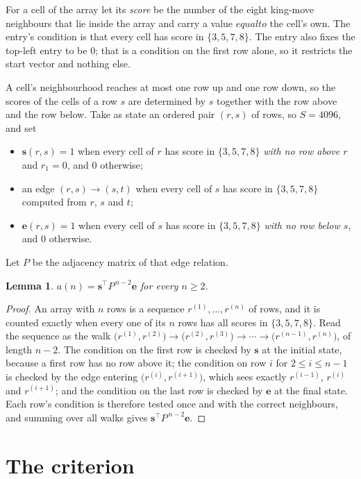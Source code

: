 \documentclass[11pt,a4paper]{article}
\theoremstyle{plain}
\newtheorem{lemma}[theorem]{Lemma}
\theoremstyle{definition}
\begin{document}
For a cell of the array let its \emph{score} be the number of the eight king-move neighbours that lie inside
the array and carry a value $equal to$ the cell's own. The entry's condition is that every cell
has score in $\{3,5,7,8\}$. The entry also fixes the top-left entry to be $0$; that is a condition on the first row alone, so it restricts the start vector and nothing else.

A cell's neighbourhood reaches at most one row up and one row down, so the scores of the
cells of a row $s$ are determined by $s$ together with the row above and the row below.
Take as state an ordered pair $(r,s)$ of rows, so $S=4096$, and set
\begin{itemize}
\item $\mathbf{s}(r,s)=1$ when every cell of $r$ has score in $\{3,5,7,8\}$ \emph{with no row
above $r$} and $r_1=0$, and $0$ otherwise;
\item an edge $(r,s)\to(s,t)$ when every cell of $s$ has score in $\{3,5,7,8\}$ computed from
$r$, $s$ and $t$;
\item $\mathbf{e}(r,s)=1$ when every cell of $s$ has score in $\{3,5,7,8\}$ \emph{with no row
below $s$}, and $0$ otherwise.
\end{itemize}
Let $P$ be the adjacency matrix of that edge relation.

\begin{lemma}\label{lem:walk}
$a(n)=\mathbf{s}^{\!\top}P^{\,n-2}\mathbf{e}$ for every $n\ge2$.
\end{lemma}

\begin{proof}
An array with $n$ rows is a sequence $r^{(1)},\dots,r^{(n)}$ of rows, and it is counted
exactly when every one of its $n$ rows has all scores in $\{3,5,7,8\}$. Read the sequence as the
walk $\bigl(r^{(1)},r^{(2)}\bigr)\to\bigl(r^{(2)},r^{(3)}\bigr)\to\cdots\to
\bigl(r^{(n-1)},r^{(n)}\bigr)$, of length $n-2$. The condition on the first row is
checked by $\mathbf{s}$ at the initial state, because a first row has no row above it; the
condition on row $i$ for $2\le i\le n-1$ is checked by the edge entering
$\bigl(r^{(i)},r^{(i+1)}\bigr)$, which sees exactly $r^{(i-1)}$, $r^{(i)}$ and
$r^{(i+1)}$; and the condition on the last row is checked by $\mathbf{e}$ at the final
state. Each row's condition is therefore tested once and with the correct neighbours, and
summing over all walks gives $\mathbf{s}^{\!\top}P^{\,n-2}\mathbf{e}$.
\end{proof}

\section{The criterion}
\end{document}
